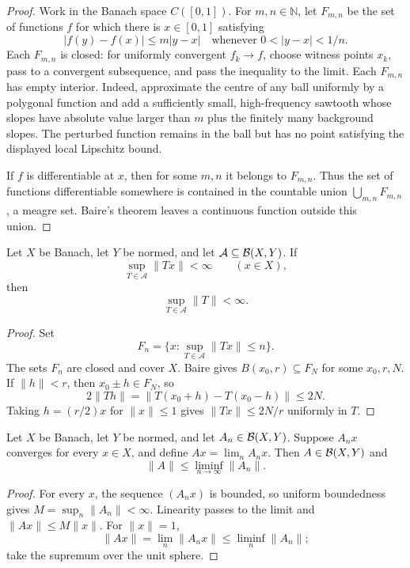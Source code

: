 \begin{proof}
Work in the Banach space $C([0,1])$.  For $m,n\in\mathbb N$, let $F_{m,n}$ be
the set of functions $f$ for which there is $x\in[0,1]$ satisfying
\[
  |f(y)-f(x)|\le m|y-x|
  \quad\text{whenever }0<|y-x|<1/n.
\]
Each $F_{m,n}$ is closed: for uniformly convergent $f_k\to f$, choose witness
points $x_k$, pass to a convergent subsequence, and pass the inequality to the
limit.  Each $F_{m,n}$ has empty interior.  Indeed, approximate the centre of
any ball uniformly by a polygonal function and add a sufficiently small,
high-frequency sawtooth whose slopes have absolute value larger than
$m$ plus the finitely many background slopes.  The perturbed function remains
in the ball but has no point satisfying the displayed local Lipschitz bound.

If $f$ is differentiable at $x$, then for some $m,n$ it belongs to $F_{m,n}$.
Thus the set of functions differentiable somewhere is contained in the
countable union $\bigcup_{m,n}F_{m,n}$, a meagre set.  Baire's theorem leaves
a continuous function outside this union.
\end{proof}

\begin{notetheorem}
Let $X$ be Banach, let $Y$ be normed, and let
$\mathcal A\subseteq\mathcal{B}(X,Y)$.  If
\[
  \sup_{T\in\mathcal A}\|Tx\|<\infty
  \qquad(x\in X),
\]
then
\[
  \sup_{T\in\mathcal A}\|T\|<\infty.
\]
\end{notetheorem}

\begin{proof}
Set
\[
  F_n=\{x:\sup_{T\in\mathcal A}\|Tx\|\le n\}.
\]
The sets $F_n$ are closed and cover $X$.  Baire gives
$B(x_0,r)\subseteq F_N$ for some $x_0,r,N$.  If $\|h\|<r$, then
$x_0\pm h\in F_N$, so
\[
  2\|Th\|=\|T(x_0+h)-T(x_0-h)\|\le2N.
\]
Taking $h=(r/2)x$ for $\|x\|\le1$ gives
$\|Tx\|\le2N/r$ uniformly in $T$.
\end{proof}

\begin{notetheorem}
Let $X$ be Banach, let $Y$ be normed, and let $A_n\in\mathcal{B}(X,Y)$.  Suppose
$A_nx$ converges for every $x\in X$, and define
$Ax=\lim_nA_nx$.  Then $A\in\mathcal{B}(X,Y)$ and
\[
  \|A\|\le\liminf_{n\to\infty}\|A_n\|.
\]
\end{notetheorem}

\begin{proof}
For every $x$, the sequence $(A_nx)$ is bounded, so uniform boundedness gives
$M=\sup_n\|A_n\|<\infty$.  Linearity passes to the limit and
$\|Ax\|\le M\|x\|$.  For $\|x\|=1$,
\[
  \|Ax\|=\lim_n\|A_nx\|
  \le\liminf_n\|A_n\|;
\]
take the supremum over the unit sphere.
\end{proof}

